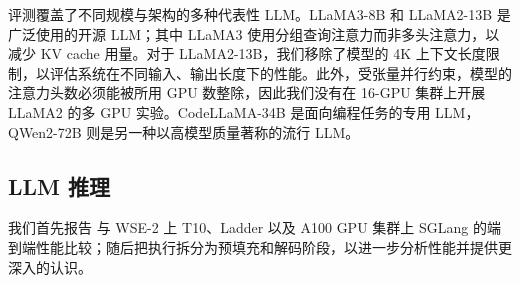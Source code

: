 评测覆盖了不同规模与架构的多种代表性 LLM。LLaMA3-8B 和 LLaMA2-13B 是广泛使用的开源 LLM；其中 LLaMA3 使用分组查询注意力而非多头注意力，以减少 KV cache 用量。对于 LLaMA2-13B，我们移除了模型的 4K 上下文长度限制，以评估系统在不同输入、输出长度下的性能。此外，受张量并行约束，模型的注意力头数必须能被所用 GPU 数整除，因此我们没有在 16-GPU 集群上开展 LLaMA2 的多 GPU 实验。CodeLLaMA-34B 是面向编程任务的专用 LLM，QWen2-72B 则是另一种以高模型质量著称的流行 LLM。

\vspace{-0.2cm}
\subsection{LLM 推理}\label{sec:eval:e2e}

我们首先报告 \sys 与 WSE-2 上 T10、Ladder 以及 A100 GPU 集群上 SGLang 的端到端性能比较；随后把执行拆分为预填充和解码阶段，以进一步分析性能并提供更深入的认识。

